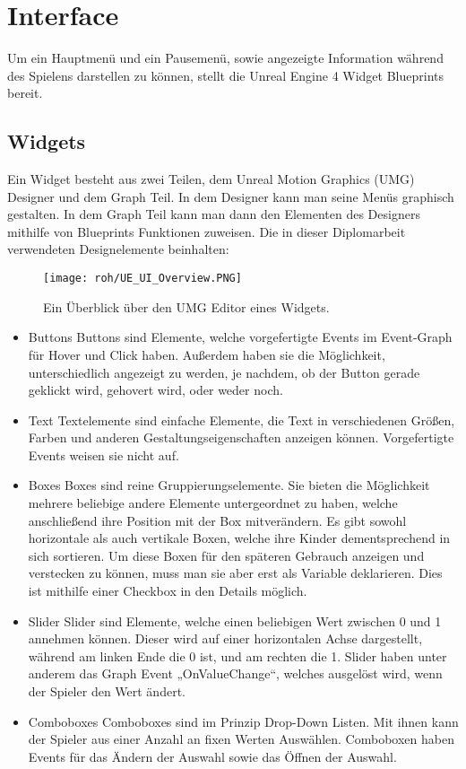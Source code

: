 \section{Interface}
Um ein Hauptmenü und ein Pausemenü, sowie angezeigte Information während des Spielens darstellen zu können, stellt die Unreal Engine 4 Widget Blueprints bereit.
\subsection{Widgets} \citep{ue:UIWidgets}
Ein Widget besteht aus zwei Teilen, dem Unreal Motion Graphics (UMG) Designer und dem Graph Teil.
In dem Designer kann man seine Menüs graphisch gestalten.
In dem Graph Teil kann man dann den Elementen des Designers mithilfe von Blueprints Funktionen zuweisen.
Die in dieser Diplomarbeit verwendeten Designelemente beinhalten:
\begin{figure}[H]
    \centering
    \texttt{[image: roh/UE\_UI\_Overview.PNG]}
    \caption{Ein Überblick über den UMG Editor eines Widgets.}
    \label{UE:UI_Overview}
\end{figure}
\begin{itemize}
    \item Buttons
    Buttons sind Elemente, welche vorgefertigte Events im Event-Graph für Hover und Click haben.
    Außerdem haben sie die Möglichkeit, unterschiedlich angezeigt zu werden, je nachdem, ob der Button gerade geklickt wird, gehovert wird, oder weder noch.
    \item Text
    Textelemente sind einfache Elemente, die Text in verschiedenen Größen, Farben und anderen Gestaltungseigenschaften anzeigen können.
    Vorgefertigte Events weisen sie nicht auf.
    \item Boxes
    Boxes sind reine Gruppierungselemente.
    Sie bieten die Möglichkeit mehrere beliebige andere Elemente untergeordnet zu haben, welche anschließend ihre Position mit der Box mitverändern.
    Es gibt sowohl horizontale als auch vertikale Boxen, welche ihre Kinder dementsprechend in sich sortieren.
    Um diese Boxen für den späteren Gebrauch anzeigen und verstecken zu können, muss man sie aber erst als Variable deklarieren.
    Dies ist mithilfe einer Checkbox in den Details möglich.
    \item Slider
    Slider sind Elemente, welche einen beliebigen Wert zwischen 0 und 1 annehmen können.
    Dieser wird auf einer horizontalen Achse dargestellt, während am linken Ende die 0 ist, und am rechten die 1.
    Slider haben unter anderem das Graph Event „OnValueChange“, welches ausgelöst wird, wenn der Spieler den Wert ändert.
    \item Comboboxes
    Comboboxes sind im Prinzip Drop-Down Listen.
    Mit ihnen kann der Spieler aus einer Anzahl an fixen Werten Auswählen.
    Comboboxen haben Events für das Ändern der Auswahl sowie das Öffnen der Auswahl.
\end{itemize}
